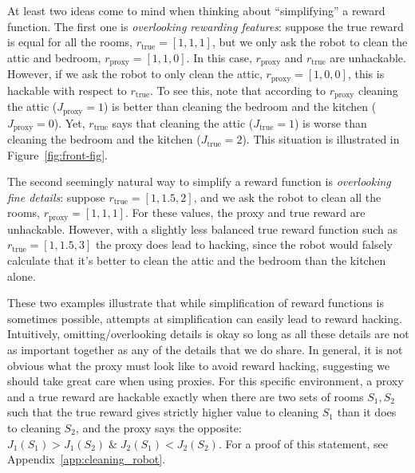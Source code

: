 \documentclass{article}
\theoremstyle{definition}
\theoremstyle{remark}
\begin{document}
\vspace{-4pt}
At least two ideas come to mind when thinking about \enquote{simplifying} a reward function.
The first one is \textit{overlooking rewarding features}: suppose the true reward
is equal for all the rooms, $r_\text{true} = [1, 1, 1]$,
but we only ask the robot to clean the attic and bedroom, $r_\text{proxy} = [1, 1, 0]$. 
In this case, $r_\text{proxy}$ and $r_\text{true}$ are unhackable.
However, if we ask the robot to only clean the attic,
$r_\text{proxy} = [1, 0, 0]$, this is hackable with respect to $r_\text{true}$. %
To see this, note that according to $r_\text{proxy}$ cleaning the attic ($J_\text{proxy}=1$) is better than cleaning the bedroom and the kitchen ($J_\text{proxy}=0$). 
Yet, $r_\text{true}$ says that cleaning the attic ($J_\text{true}=1$) is worse than cleaning the bedroom and the kitchen ($J_\text{true}=2$).
This situation is illustrated in Figure~\ref{fig:front-fig}. 



The second seemingly natural way to simplify a reward function is \textit{overlooking fine details}:
suppose $r_\text{true} = [1, 1.5, 2]$,
and we ask the robot to clean all the rooms,
$r_\text{proxy} = [1, 1, 1]$. For these values, the proxy
and true reward are unhackable. However, 
with a slightly less balanced true reward function 
such as $r_\text{true} = [1, 1.5, 3]$ the proxy does lead to hacking,
since the robot would falsely calculate that it's 
better to clean the attic and the bedroom than
the kitchen alone.

These two examples illustrate that while simplification of reward functions is sometimes possible, attempts at simplification can easily lead to  %
reward hacking. 
Intuitively, omitting/overlooking details is okay so long as all these details are not as important together as any of the details that we do share.
In general, it is not obvious what the proxy must look like to avoid reward hacking, suggesting we should take great care when using proxies.
For this specific environment, a proxy and a true reward are hackable exactly when there are two sets of rooms $S_1, S_2$ such that the true reward gives strictly higher value to cleaning $S_1$ than it does to cleaning $S_2$, and the proxy says the opposite: $J_1(S_1) > J_1(S_2) \; \& \; J_2(S_1) < J_2(S_2)$.
For a proof of this statement, see Appendix~\ref{app:cleaning_robot}.





        
    
\end{document}
